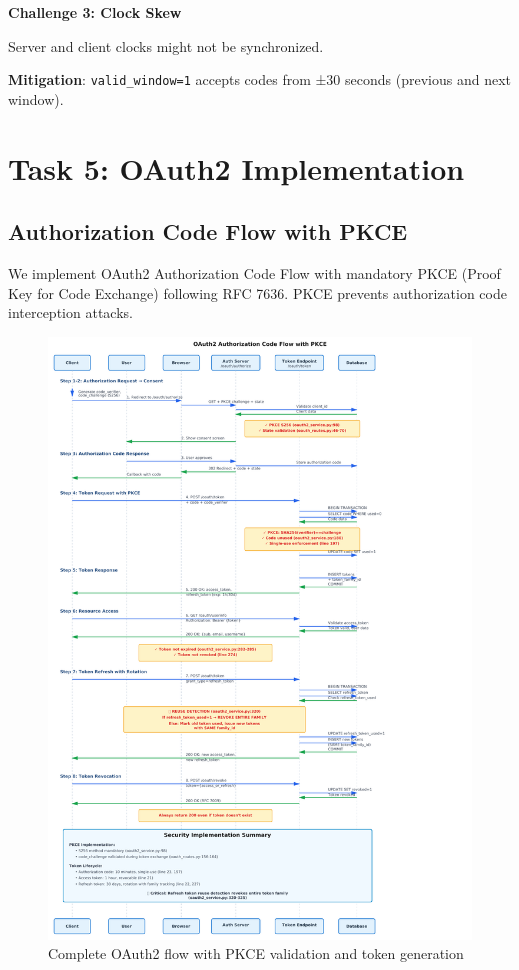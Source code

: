 \documentclass[12pt,a4paper]{article}
\begin{document}
\textbf{Challenge 3: Clock Skew}

Server and client clocks might not be synchronized.

\textbf{Mitigation}: \texttt{valid\_window=1} accepts codes from ±30 seconds (previous and next window).

\section{Task 5: OAuth2 Implementation}

\subsection{Authorization Code Flow with PKCE}

We implement OAuth2 Authorization Code Flow with mandatory PKCE (Proof Key for Code Exchange) following RFC 7636. PKCE prevents authorization code interception attacks.

\begin{figure}[H]
    \centering
    \includegraphics[width=\textwidth]{diagrams/3_oauth2_sequence.pdf}
    \caption{Complete OAuth2 flow with PKCE validation and token generation}
    \label{fig:oauth2}
\end{figure}
\end{document}
